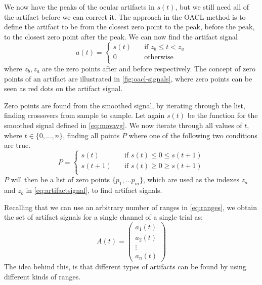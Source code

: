 We now have the peaks of the ocular artifacts in $s(t)$, but we still need all of the artifact before we can correct it. The approach in the OACL method is to define the artifact to be from the closest zero point to the peak, before the peak, to the closest zero point after the peak. We can now find the artifact signal 
\begin{equation}
\label{eq:artifactsignal}
a(t) =
\begin{cases}
s(t)      & \quad \text{if } z_b \leq t < z_a\\
0  & \quad \text{otherwise}\\
\end{cases}
\end{equation}
where $z_b, z_a$ are the zero points after and before respectively. The concept of zero points of an artifact are illustrated in \cref{fig:oacl-signals}, where zero points can be seen as red dots on the artifact signal. 

Zero points are found from the smoothed signal, by iterating through the list, finding crossovers from sample to sample. 
Let again $s(t)$ be the function for the smoothed signal defined in \cref{eq:movavg}. We now iterate through all values of $t$, where $t \in \{0,...,n\}$, finding all points $P$ where one of the following two conditions are true. 
\begin{equation}
\label{eq:zero_points}
P =
\begin{cases}
s(t)      & \quad \text{if } s(t) \leq 0 \leq s(t + 1)\\
s(t + 1)  & \quad \text{if } s(t) \geq 0 \geq s(t + 1)\\
\end{cases}
\end{equation}
$P$ will then be a list of zero points $\{p_1,...p_m\}$, which are used as the indexes $z_a$ and $z_b$ in \cref{eq:artifactsignal}, to find artifact signals.

Recalling that we can use an arbitrary number of ranges in \cref{eq:ranges}, we obtain the set of artifact signals for a single channel of a single trial as:
\begin{equation}\label{eq:artifact-signals}
A(t)=  \begin{pmatrix}
a_1(t) \\
a_2(t) \\
\vdots  \\
a_n(t) 
\end{pmatrix}
\end{equation}
The idea behind this, is that different types of artifacts can be found by using different kinds of ranges. 
